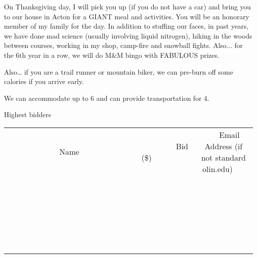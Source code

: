 \documentclass[11pt]{article}
\begin{document}
On Thanksgiving day, I will pick you up (if you do not have a car) and bring you to our house in Acton for a GIANT meal and activities.  You will be an honorary member of my family for the day. In addition to stuffing our faces, in past years, we have done mad science (usually involving liquid nitrogen), hiking in the woods between courses, working in my shop, camp-fire and snowball fights. Also... for the 6th year in a row, we will do M\&M bingo with FABULOUS prizes. 



Also… if you are a trail runner or mountain biker, we can pre-burn off some calories if you arrive early.



We can accommodate up to 6 and can provide transportation for 4.



Highest bidders \\
					[6ex]
					\begin{tabular}{c c c}
						~~~~~~~~~~~~~Name~~~~~~~~~~~~~ & ~~~~~~~~~Bid (\$)~~~~~~~~~ & ~~~Email Address (if not standard olin.edu)~~~ \\
				
 & & \\
\hline
 & & \\
\hline
 & & \\
\hline
 & & \\
\hline
 & & \\
\hline
 & & \\
\hline
 & & \\
\hline
 & & \\
\hline
 & & \\
\hline
 & & \\
\hline
 & & \\
\hline
 & & \\
\hline
 & & \\
\hline
 & & \\
\hline
 & & \\
\hline
 & & \\
\hline
 & & \\
\hline
 & & \\
\hline
 & & \\
\hline
 & & \\
\hline
 & & \\
\hline
 & & \\
\hline
 & & \\
\hline
 & & \\
\hline
 & & \\
\hline
 & & \\
\hline
					\end{tabular}
					\clearpage
				
\end{document}
